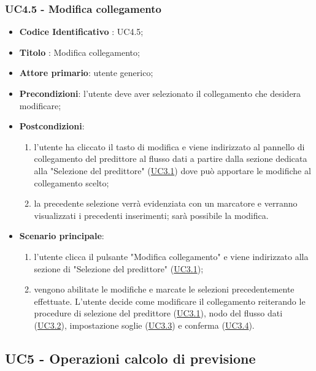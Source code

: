 	\label{par:UC4.5}
	\subsubsection{UC4.5 - Modifica collegamento}

		\begin{itemize}
			\item\textbf{Codice Identificativo} : UC4.5;
			\item\textbf{Titolo} : Modifica collegamento;
			\item\textbf{Attore primario}: utente generico;
			\item\textbf{Precondizioni}: l'utente deve aver selezionato il collegamento che desidera modificare;
			\item\textbf{Postcondizioni}:
				\begin{enumerate}
					\item l'utente ha cliccato il tasto di modifica e viene indirizzato al pannello di collegamento del predittore al flusso dati a partire dalla sezione dedicata alla "Selezione del predittore" (\hyperref[par:UC3.1]{UC3.1}) dove può apportare le modifiche al collegamento scelto;
					\item la precedente selezione verrà evidenziata con un marcatore e verranno visualizzati i precedenti inserimenti; sarà possibile la modifica.
				\end{enumerate}
			\item\textbf{Scenario principale}:
				\begin{enumerate}
					\item l'utente clicca il pulsante "Modifica collegamento" e viene indirizzato alla sezione di "Selezione del predittore" (\hyperref[par:UC3.1]{UC3.1});
					\item vengono abilitate le modifiche e marcate le selezioni precedentemente effettuate. L'utente decide come modificare il collegamento reiterando le procedure di selezione del predittore (\hyperref[par:UC3.1]{UC3.1}), nodo del flusso dati (\hyperref[par:UC3.2]{UC3.2}), impostazione soglie (\hyperref[par:UC3.3]{UC3.3}) e conferma (\hyperref[par:UC3.4]{UC3.4}).
				\end{enumerate}		
		\end{itemize}


	\label{par:UC5}
	\subsection{UC5 - Operazioni calcolo di previsione}

